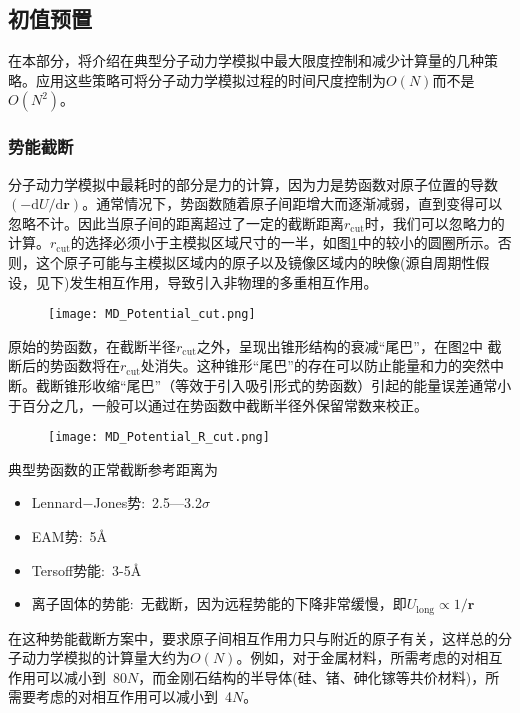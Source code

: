 \subsection{初值预置}
在本部分，将介绍在典型分子动力学模拟中最大限度控制和减少计算量的几种策略。应用这些策略可将分子动力学模拟过程的时间尺度控制为$O(N)$而不是$O(N^2)$。
\subsubsection{势能截断}
分子动力学模拟中最耗时的部分是力的计算，因为力是势函数对原子位置的导数$(-\mathrm{d}U/\mathrm{d}\mathbf{r})$。通常情况下，势函数随着原子间距增大而逐渐减弱，直到变得可以忽略不计。因此当原子间的距离超过了一定的截断距离$r_{\mathrm{cut}}$时，我们可以忽略力的计算。$r_{\mathrm{cut}}$的选择必须小于主模拟区域尺寸的一半，如图\ref{MD_R_cut}中的较小的圆圈所示。否则，这个原子可能与主模拟区域内的原子以及镜像区域内的映像(源自周期性假设，见下)发生相互作用，导致引入非物理的多重相互作用。
\begin{figure}[h!]
\centering
\vspace*{-0.1in}
\texttt{[image: MD\_Potential\_cut.png]}
\caption{\fontsize{7.2pt}{4.2pt}\selectfont{二维平面内周期边界条件下势能截断范围(小圆圈)和近邻列表范围(大圆圈)示意图，中心为主模拟区域，周围是镜像模拟区.}}%
\label{MD_R_cut}
\end{figure}
原始的势函数，在截断半径$r_{\mathrm{cut}}$之外，呈现出锥形结构的衰减“尾巴”，在图\ref{Potential_R_cut}中 截断后的势函数将在$r_{\mathrm{cut}}$处消失。这种锥形“尾巴”的存在可以防止能量和力的突然中断。截断锥形收缩“尾巴”（等效于引入吸引形式的势函数）引起的能量误差通常小于百分之几，一般可以通过在势函数中截断半径外保留常数来校正。
\begin{figure}[h!]
\centering
\vspace*{-0.1in}
\texttt{[image: MD\_Potential\_R\_cut.png]}
\caption{\fontsize{7.2pt}{4.2pt}}%
\label{Potential_R_cut}
\end{figure}

典型势函数的正常截断参考距离为
\begin{itemize}
	\item \textrm{Lennard−Jones}势:~2.5—3.2$\sigma$
	\item \textrm{EAM}势:~5\AA
	\item \textrm{Tersoff}势能:~3-5\AA
	\item 离子固体的势能:~无截断，因为远程势能的下降非常缓慢，即$U_{\mathrm{long}}\propto1/\mathbf{r}$
\end{itemize}
在这种势能截断方案中，要求原子间相互作用力只与附近的原子有关，这样总的分子动力学模拟的计算量大约为$O(N)$。例如，对于金属材料，所需考虑的对相互作用可以减小到~80$N$，而金刚石结构的半导体(硅、锗、砷化镓等共价材料)，所需要考虑的对相互作用可以减小到~4$N$。

